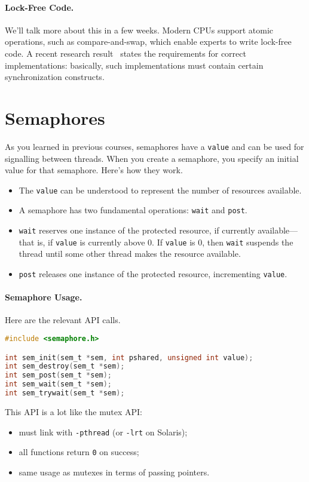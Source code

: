 \paragraph{Lock-Free Code.} We'll talk more about this in a few weeks.
Modern CPUs support atomic operations, such as compare-and-swap, which
enable experts to write lock-free code. A recent research 
result~\cite{mckenney11:_concur,Attiya:2011:LOE:1926385.1926442} states the requirements for correct implementations: basically,
such implementations must contain certain synchronization constructs.

\section*{Semaphores}
As you learned in previous courses, semaphores have a {\tt value} and
can be used for signalling between threads. When you create a semaphore,
you specify an initial value for that semaphore. Here's how they work.

\begin{itemize}
\item The {\tt value} can be understood to represent the number of resources available.
\item A semaphore has two fundamental operations: {\tt wait} and 
{\tt post}.
\item {\tt wait} reserves one instance of the protected resource, if currently
available---that is, if {\tt value} is currently above 0. If {\tt value} 
is 0, then {\tt wait} suspends the thread until some other thread makes
the resource available.
\item {\tt post} releases one instance of the protected resource,
incrementing {\tt value}.
\end{itemize}

\paragraph{Semaphore Usage.} Here are the relevant API calls.
  \begin{lstlisting}[language=C]
#include <semaphore.h>

int sem_init(sem_t *sem, int pshared, unsigned int value);
int sem_destroy(sem_t *sem);
int sem_post(sem_t *sem);
int sem_wait(sem_t *sem);
int sem_trywait(sem_t *sem);
  \end{lstlisting}

This API is a lot like the mutex API:
  \begin{itemize}
    \item must link with {\tt -pthread} (or {\tt -lrt} on Solaris);
    \item all functions return {\tt 0} on success;
    \item same usage as mutexes in terms of passing pointers.
  \end{itemize}

